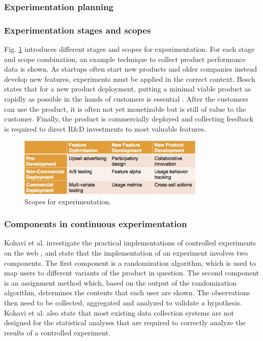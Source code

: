 \documentclass[english]{tktltiki2}
\theoremstyle{definition}
\theoremstyle{remark}
\begin{document}
\subsubsection{Experimentation planning}

\subsubsection{Experimentation stages and scopes}
Fig. \ref{fig4} introduces different stages and scopes for experimentation. For each stage and scope combination, an example technique to collect product performance data is shown. As startups often start new products and older companies instead develop new features, experiments must be applied in the correct context. Bosch states that for a new product deployment, putting a minimal viable product as rapidly as possible in the hands of customers is essential \cite{bosch2012building}. After the customers can use the product, it is often not yet monetizable but is still of value to the customer. Finally, the product is commercially deployed and collecting feedback is required to direct R\&D investments to most valuable features.
\begin{figure}[h]
	\centering
	\includegraphics[width=3.5in]{scopes.jpg}
	\caption{Scopes for experimentation\cite{bosch2012building}.}
	\label{fig4}
\end{figure}

\subsubsection{Components in continuous experimentation}
Kohavi et al. investigate the practical implementations of controlled experiments on the web \cite{kohavi2007practical}, and state that the implementation of an experiment involves two components. The first component is a randomization algorithm, which is used to map users to different variants of the product in question. The second component is an assignment method which, based on the output of the randomization algorithm, determines the contents that each user are shown. The observations then need to be collected, aggregated and analyzed to validate a hypothesis. Kohavi et al. also state that most existing data collection systems are not designed for the statistical analyses that are required to correctly analyze the results of a controlled experiment.
\end{document}
